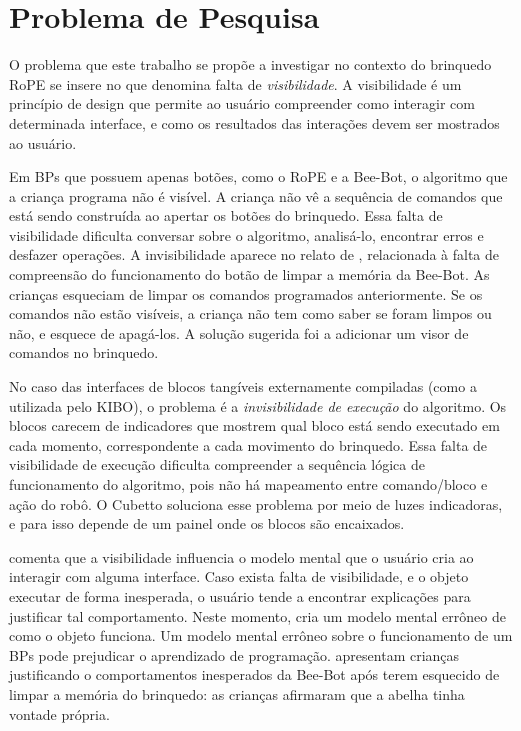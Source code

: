 \section{Problema de Pesquisa} \label{s_cintro_problema_pesquisa}

O problema que este trabalho se propõe a investigar no contexto do brinquedo RoPE se insere no que  denomina falta de \textit{visibilidade}. A visibilidade é um princípio de design que permite ao usuário compreender como interagir com determinada interface, e como os resultados das interações devem ser mostrados ao usuário.

Em BPs que possuem apenas botões, como o RoPE e a Bee-Bot, o algoritmo que a criança programa não é visível. A criança não vê a sequência de comandos que está sendo construída ao apertar os botões do brinquedo. Essa falta de visibilidade dificulta conversar sobre o algoritmo, analisá-lo, encontrar erros e desfazer operações. A invisibilidade aparece no relato de , relacionada à falta de compreensão do funcionamento do botão de limpar a memória da Bee-Bot. As crianças esqueciam de limpar os comandos programados anteriormente. Se os comandos não estão visíveis, a criança não tem como saber se foram limpos ou não, e esquece de apagá-los. A solução sugerida foi a adicionar um visor de comandos no brinquedo.

No caso das interfaces de blocos tangíveis externamente compiladas (como a utilizada pelo KIBO), o problema é a \textit{invisibilidade de execução} do algoritmo. Os blocos carecem de indicadores que mostrem qual bloco está sendo executado em cada momento, correspondente a cada movimento do brinquedo. Essa falta de visibilidade de execução dificulta compreender a sequência lógica de funcionamento do algoritmo, pois não há mapeamento entre comando/bloco e ação do robô. O Cubetto soluciona esse problema por meio de luzes indicadoras, e para isso depende de um painel onde os blocos são encaixados.

 comenta que a visibilidade influencia o modelo mental que o usuário cria ao interagir com alguma interface. Caso exista falta de visibilidade, e o objeto executar de forma inesperada, o usuário tende a encontrar explicações para justificar tal comportamento. Neste momento, cria um modelo mental errôneo de como o objeto funciona. Um modelo mental errôneo sobre o funcionamento de um BPs pode prejudicar o aprendizado de programação.  apresentam crianças justificando o comportamentos inesperados da Bee-Bot após terem esquecido de limpar a memória do brinquedo: as crianças afirmaram que a abelha tinha vontade própria.

